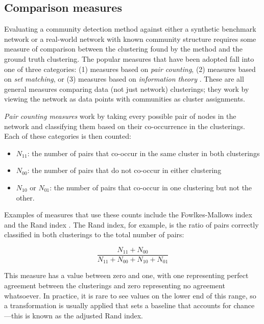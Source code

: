 \hypertarget{comparison-measures}{\subsection{Comparison
measures}\label{comparison-measures}}

Evaluating a community detection method against either a synthetic
benchmark network or a real-world network with known community structure
requires some measure of comparison between the clustering found by the
method and the ground truth clustering. The popular measures that have
been adopted fall into one of three categories: (1) measures based on
\emph{pair counting}, (2) measures based on \emph{set matching}, or (3)
measures based on \emph{information theory}
\autocites{meila_comparing_2007}{vinh_information_2010}. These are all
general measures comparing data (not just network) clusterings; they
work by viewing the network as data points with communities as cluster
assignments.

\emph{Pair counting measures} work by taking every possible pair of
nodes in the network and classifying them based on their co-occurrence
in the clusterings. Each of these categories is then counted:

\begin{itemize}
\tightlist
\item
  \(N_{11}\): the number of pairs that co-occur in the same cluster in
  both clusterings
\item
  \(N_{00}\): the number of pairs that do not co-occur in either
  clustering
\item
  \(N_{10}\) or \(N_{01}\): the number of pairs that co-occur in one
  clustering but not the other.
\end{itemize}

Examples of measures that use these counts include the Fowlkes-Mallows
index \autocite{fowlkes_method_1983} and the Rand index
\autocite{rand_objective_1971}. The Rand index, for example, is the
ratio of pairs correctly classified in both clusterings to the total
number of pairs:

\[\frac{N_{11} + N_{00}}{N_{11} + N_{00} + N_{10} + N_{01}}\]

This measure has a value between zero and one, with one representing
perfect agreement between the clusterings and zero representing no
agreement whatsoever. In practice, it is rare to see values on the lower
end of this range, so a transformation is usually applied that sets a
baseline that accounts for chance---this is known as the adjusted Rand
index.


